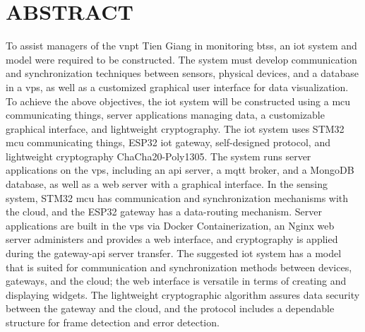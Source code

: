 \chapter*{ABSTRACT}
\label{Abstract-EN}

To assist managers of the \acrfull{vnpt} Tien Giang in monitoring \glspl{bts}, an \acrfull{iot} system and model were required to be constructed. The system must develop communication and synchronization techniques between sensors, physical devices, and a database in a \acrfull{vps}, as well as a customized graphical user interface for data visualization.
To achieve the above objectives, the \acrshort{iot} system will be constructed using a \acrfull{mcu} communicating things, server applications managing data, a customizable graphical interface, and lightweight cryptography.
The \acrshort{iot} system uses STM32 \acrshort{mcu} communicating things, ESP32 \acrshort{iot} gateway, self-designed protocol, and lightweight cryptography ChaCha20-Poly1305. The system runs server applications on the \acrshort{vps}, including an \acrshort{api} server, a \acrfull{mqtt} broker, and a MongoDB database, as well as a web server with a graphical interface.
In the sensing system, STM32 \acrshort{mcu} has communication and synchronization mechanisms with the cloud, and the ESP32 gateway has a data-routing mechanism. Server applications are built in the \acrshort{vps} via Docker Containerization, an Nginx web server administers and provides a web interface, and cryptography is applied during the gateway-\acrshort{api} server transfer.
The suggested \acrshort{iot} system has a model that is suited for communication and synchronization methods between devices, gateways, and the cloud; the web interface is versatile in terms of creating and displaying widgets. The lightweight cryptographic algorithm assures data security between the gateway and the cloud, and the protocol includes a dependable structure for frame detection and error detection.